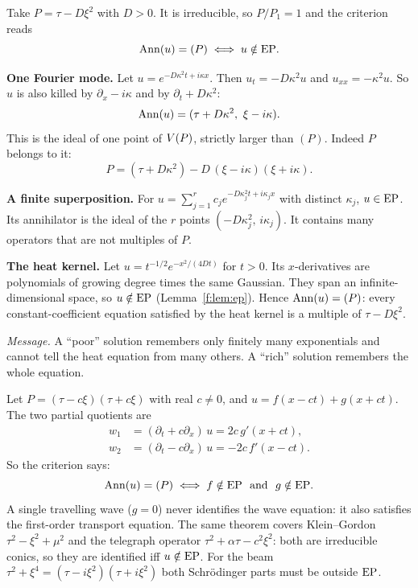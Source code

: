 \begin{example}\label{ex:heat3}
Take $P=\tau-D\xi^2$ with $D>0$. It is irreducible, so $P/P_1=1$ and the criterion reads
\[
\operatorname{Ann}(u)=(P)\iff u\notin\mathrm{EP} .
\]

\textbf{One Fourier mode.} Let $u=e^{-D\kappa^2t+i\kappa x}$. Then $u_t=-D\kappa^2u$ and $u_{xx}=-\kappa^2u$. So $u$ is also killed by $\partial_x-i\kappa$ and by $\partial_t+D\kappa^2$:
\[
\Ann(u)=(\tau+D\kappa^2,\ \xi-i\kappa).
\]
This is the ideal of one point of $V(P)$, strictly larger than $(P)$. Indeed $P$ belongs to it:
\[
P=(\tau+D\kappa^2)-D\,(\xi-i\kappa)(\xi+i\kappa).
\]

\textbf{A finite superposition.} For $u=\sum_{j=1}^rc_je^{-D\kappa_j^2t+i\kappa_jx}$ with distinct $\kappa_j$, $u\in\mathrm{EP}$. Its annihilator is the ideal of the $r$ points $(-D\kappa_j^2,\,i\kappa_j)$. It contains many operators that are not multiples of $P$.

\textbf{The heat kernel.} Let $u=t^{-1/2}e^{-x^2/(4Dt)}$ for $t>0$. Its $x$-derivatives are polynomials of growing degree times the same Gaussian. They span an infinite-dimensional space, so $u\notin\mathrm{EP}$ (Lemma~\ref{f:lem:ep}). Hence $\operatorname{Ann}(u)=(P)$: every constant-coefficient equation satisfied by the heat kernel is a multiple of $\tau-D\xi^2$.

\emph{Message.} A ``poor'' solution remembers only finitely many exponentials and cannot tell the heat equation from many others. A ``rich'' solution remembers the whole equation.
\end{example}

\begin{example}\label{ex:wave-ident}
Let $P=(\tau-c\xi)(\tau+c\xi)$ with real $c\ne0$, and $u=f(x-ct)+g(x+ct)$. The two partial quotients are
\begin{align*}
w_1&=(\partial_t+c\partial_x)\,u=2c\,g'(x+ct),\\
w_2&=(\partial_t-c\partial_x)\,u=-2c\,f'(x-ct).
\end{align*}
So the criterion says:
\[
\Ann(u)=(P)\iff f\notin\EP\ \text{ and }\ g\notin\EP .
\]
A single travelling wave ($g=0$) never identifies the wave equation: it also satisfies the first-order transport equation. The same theorem covers Klein--Gordon $\tau^2-\xi^2+\mu^2$ and the telegraph operator $\tau^2+\alpha\tau-c^2\xi^2$: both are irreducible conics, so they are identified iff $u\notin\mathrm{EP}$. For the beam $\tau^2+\xi^4=(\tau-i\xi^2)(\tau+i\xi^2)$ both Schr\"odinger parts must be outside $\mathrm{EP}$.

\end{example}

